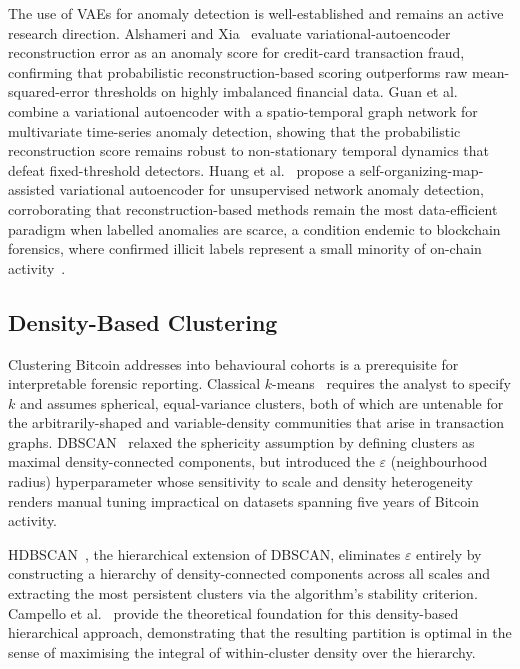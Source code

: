 \documentclass[journal]{IEEEtran}
\begin{document}
The use of VAEs for anomaly detection is well-established and remains an
active research direction.  Alshameri and Xia~\cite{Alshameri2024} evaluate
variational-autoencoder reconstruction error as an anomaly score for
credit-card transaction fraud, confirming that probabilistic
reconstruction-based scoring outperforms raw mean-squared-error thresholds on
highly imbalanced financial data.  Guan et al.~\cite{Guan2024} combine a
variational autoencoder with a spatio-temporal graph network for multivariate
time-series anomaly detection, showing that the probabilistic reconstruction
score remains robust to non-stationary temporal dynamics that defeat
fixed-threshold detectors.  Huang et al.~\cite{Huang2025} propose a
self-organizing-map-assisted variational autoencoder for unsupervised network
anomaly detection, corroborating that reconstruction-based methods remain the
most data-efficient paradigm when labelled anomalies are scarce, a condition
endemic to blockchain forensics, where confirmed illicit labels represent a
small minority of on-chain activity~\cite{Dudani2023}.

\subsection{Density-Based Clustering}
\label{subsec:clustering_related}

Clustering Bitcoin addresses into behavioural cohorts is a prerequisite for
interpretable forensic reporting.  Classical $k$-means~\cite{Lloyd1982}
requires the analyst to specify $k$ and assumes spherical, equal-variance
clusters, both of which are untenable for the arbitrarily-shaped and
variable-density communities that arise in transaction graphs.
DBSCAN~\cite{Ester1996} relaxed the sphericity assumption by defining clusters
as maximal density-connected components, but introduced the $\varepsilon$
(neighbourhood radius) hyperparameter whose sensitivity to scale and density
heterogeneity renders manual tuning impractical on datasets spanning five years
of Bitcoin activity.

HDBSCAN~\cite{McInnes2017}, the hierarchical extension of DBSCAN, eliminates
$\varepsilon$ entirely by constructing a hierarchy of density-connected
components across all scales and extracting the most persistent clusters via the
algorithm's stability criterion.  Campello et al.~\cite{Campello2013} provide
the theoretical foundation for this density-based hierarchical approach,
demonstrating that the resulting partition is optimal in the sense of maximising
the integral of within-cluster density over the hierarchy.
\end{document}
